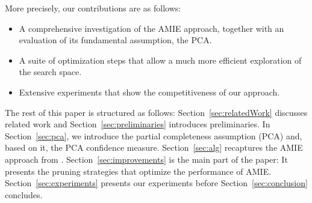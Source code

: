 \noindent More precisely, our contributions are as follows:
\begin{itemize}[noitemsep,nolistsep,leftmargin=0.4cm,midpenalty=0,label=$\bullet$]
\item A comprehensive investigation of the AMIE approach, together with an evaluation of its fundamental assumption, the PCA.%
\item A suite of optimization steps that allow a much more efficient exploration of the search space.
\item Extensive experiments that show the competitiveness of our approach.
\end{itemize}
The rest of this paper is structured as follows: Section~\ref{sec:relatedWork} discusses related work and Section~\ref{sec:preliminaries} introduces preliminaries.
In Section~\ref{sec:pca}, we introduce the partial completeness assumption (PCA) and, based on it, the PCA confidence measure.
Section~\ref{sec:alg} recaptures the AMIE approach from \cite{amie}.
Section~\ref{sec:improvements} is the main part of the paper: It presents the pruning strategies that optimize the performance of AMIE.
Section~\ref{sec:experiments} presents our experiments before Section~\ref{sec:conclusion} concludes.





